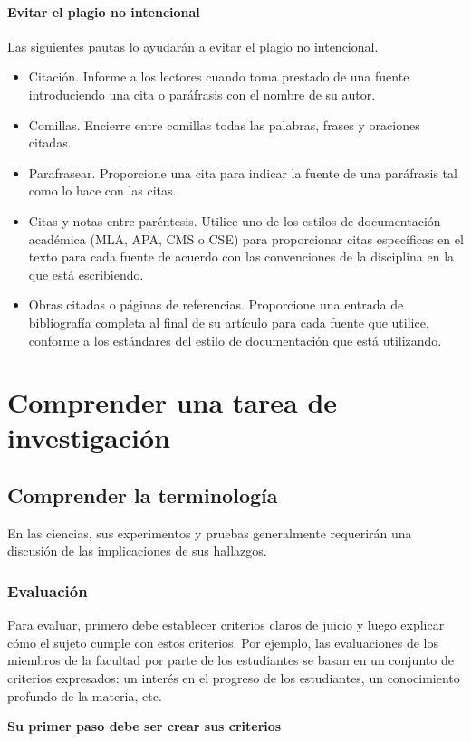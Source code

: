 \paragraph{Evitar el plagio no intencional} 
Las siguientes pautas lo ayudarán a evitar el plagio no intencional. 
\begin{itemize}
    \item Citación. Informe a los lectores cuando toma prestado de una fuente introduciendo una cita o paráfrasis con el nombre de su autor. 
    \item Comillas. Encierre entre comillas todas las palabras, frases y oraciones citadas. 
    \item Parafrasear. Proporcione una cita para indicar la fuente de una paráfrasis tal como lo hace con las citas. 
    \item Citas y notas entre paréntesis. Utilice uno de los estilos de documentación académica (MLA, APA, CMS o CSE) para proporcionar citas específicas en el texto para cada fuente de acuerdo con las convenciones de la disciplina en la que está escribiendo. 
    \item Obras citadas o páginas de referencias. Proporcione una entrada de bibliografía completa al final de su artículo para cada fuente que utilice, conforme a los estándares del estilo de documentación que está utilizando.
\end{itemize}


\section{Comprender una tarea de investigación}
\subsection{Comprender la terminología}
En las ciencias, sus experimentos y pruebas generalmente requerirán una discusión de las implicaciones de sus hallazgos.

\subsubsection{Evaluación}
Para evaluar, primero debe establecer criterios claros de juicio y luego explicar cómo el sujeto cumple con estos criterios. Por ejemplo, las evaluaciones de los miembros de la facultad por parte de los estudiantes se basan en un conjunto de criterios expresados: un interés en el progreso de los estudiantes, un conocimiento profundo de la materia, etc. 
\begin{center}
    \textbf{Su primer paso debe ser crear sus criterios}
\end{center}

